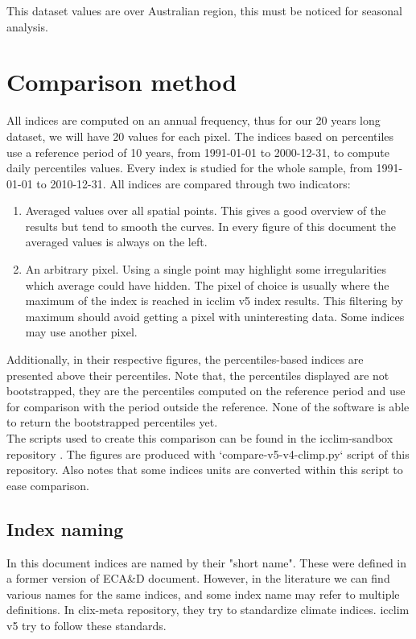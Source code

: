 \documentclass[a4paper,11pt]{article}
\begin{document}
        This dataset values are over Australian region, this must be noticed for seasonal analysis.

    \section{Comparison method}
        All indices are computed on an annual frequency, thus for our 20 years long dataset, we will have 20 values for each pixel.
        The indices based on percentiles use a reference period of 10 years, from 1991-01-01 to 2000-12-31, to compute daily percentiles values.
        Every index is studied for the whole sample, from 1991-01-01 to 2010-12-31.
        All indices are compared through two indicators: 
        \begin{enumerate}
            \item Averaged values over all spatial points. 
                This gives a good overview of the results but tend to smooth the curves. In every figure of this document the averaged values is always on the left.
            \item An arbitrary pixel. 
                Using a single point may highlight some irregularities which average could have hidden. 
                The pixel of choice is usually where the maximum of the index is reached in icclim v5 index results. 
                This filtering by maximum should avoid getting a pixel with uninteresting data. Some indices may use another pixel.
        \end{enumerate}
        Additionally, in their respective figures, the percentiles-based indices are presented above their percentiles. 
        Note that, the percentiles displayed are not bootstrapped, they are the percentiles computed on the reference period and use for comparison with the period outside the reference. 
        None of the software is able to return the bootstrapped percentiles yet.\\
        
        The scripts used to create this comparison can be found in the icclim-sandbox repository \cite{gh/icclim_sandbox}.
        The figures are produced with `compare-v5-v4-climp.py` script of this repository.
        Also notes that some indices units are converted within this script to ease comparison.

        \subsection{Index naming}
            In this document indices are named by their "short name". These were defined in a former version of ECA\&D document\cite{doc/ecad_old}.
            However, in the literature we can find various names for the same indices, and some index name may refer to multiple definitions. In clix-meta\cite{gh/clixmeta} repository, they try to standardize climate indices. 
            icclim v5 try to follow these standards.
\end{document}
